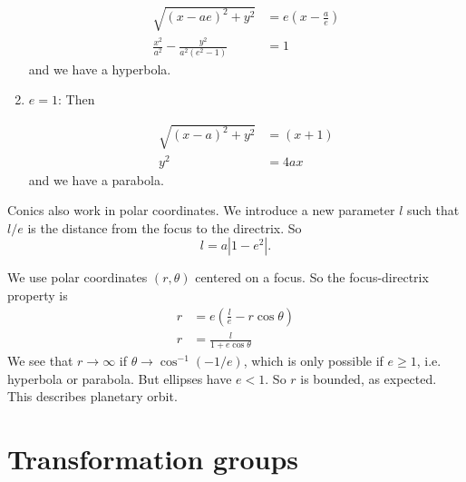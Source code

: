 \documentclass[a4paper]{article}
\begin{document}
\begin{enumerate}
\begin{center}
  \end{center}
  \begin{align*}
    \sqrt{(x - ae)^2 + y^2} &= e\left(x - \frac{a}{e}\right)\\
    \frac{x^2}{a^2} - \frac{y^2}{a^2(e^2 - 1)} &= 1
  \end{align*}
  and we have a hyperbola.
\item $e = 1$: Then
  \begin{center}
  \end{center}
  \begin{align*}
    \sqrt{(x - a)^2 + y^2} &= (x + 1)\\
    y^2 &= 4ax
  \end{align*}
  and we have a parabola.
\end{enumerate}

Conics also work in polar coordinates. We introduce a new parameter $l$ such that $l/e$ is the distance from the focus to the directrix. So
\[
l = a|1 - e^2|.
\]

We use polar coordinates $(r, \theta)$ centered on a focus. So the focus-directrix property is
\begin{align*}
  r &= e\left(\frac{l}{e} - r\cos\theta\right)\\
  r &= \frac{l}{1 + e\cos\theta}
\end{align*}
We see that $r\to \infty$ if $\theta \to \cos^{-1}(-1/e)$, which is only possible if $e\geq 1$, i.e. hyperbola or parabola. But ellipses have $e < 1$. So $r$ is bounded, as expected. This describes planetary orbit.

\section{Transformation groups}
\end{document}
